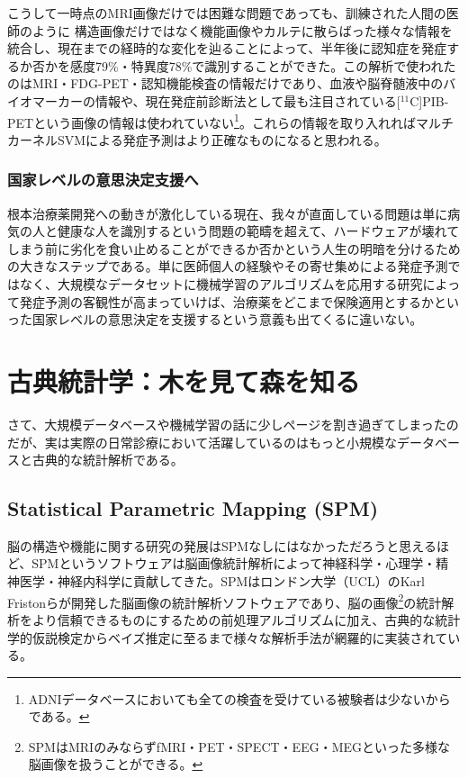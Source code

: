 こうして一時点のMRI画像だけでは困難な問題であっても、訓練された人間の医師のように
構造画像だけではなく機能画像やカルテに散らばった様々な情報を統合し、現在までの経時的な変化を辿ることによって、半年後に認知症を発症するか否かを感度79\%・特異度78\%で識別することができた。この解析で使われたのはMRI・FDG-PET・認知機能検査の情報だけであり、血液や脳脊髄液中のバイオマーカーの情報や、現在発症前診断法として最も注目されている[$^{11}$C]PIB-PETという画像の情報は使われていない\footnote{ADNIデータベースにおいても全ての検査を受けている被験者は少ないからである。}。これらの情報を取り入れればマルチカーネルSVMによる発症予測はより正確なものになると思われる。

\subsubsection{国家レベルの意思決定支援へ}
根本治療薬開発への動きが激化している現在、我々が直面している問題は単に病気の人と健康な人を識別するという問題の範疇を超えて、ハードウェアが壊れてしまう前に劣化を食い止めることができるか否かという人生の明暗を分けるための大きなステップである。単に医師個人の経験やその寄せ集めによる発症予測ではなく、大規模なデータセットに機械学習のアルゴリズムを応用する研究によって発症予測の客観性が高まっていけば、治療薬をどこまで保険適用とするかといった国家レベルの意思決定を支援するという意義も出てくるに違いない。


\section{古典統計学：木を見て森を知る}
さて、大規模データベースや機械学習の話に少しページを割き過ぎてしまったのだが、実は実際の日常診療において活躍しているのはもっと小規模なデータベースと古典的な統計解析である。

\subsection{Statistical Parametric Mapping (SPM)}
脳の構造や機能に関する研究の発展はSPMなしにはなかっただろうと思えるほど、SPMというソフトウェアは脳画像統計解析によって神経科学・心理学・精神医学・神経内科学に貢献してきた。SPMはロンドン大学（UCL）のKarl Fristonらが開発した脳画像の統計解析ソフトウェアであり、脳の画像\footnote{SPMはMRIのみならずfMRI・PET・SPECT・EEG・MEGといった多様な脳画像を扱うことができる。}の統計解析をより信頼できるものにするための前処理アルゴリズムに加え、古典的な統計学的仮説検定からベイズ推定に至るまで様々な解析手法が網羅的に実装されている。

